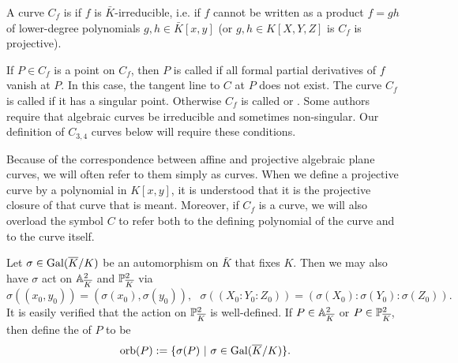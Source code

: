 A curve $C_f$ is  if $f$ is $\bar K$-irreducible,
i.e. if $f$ cannot be written as a product $f = gh$ of lower-degree polynomials $g, h \in \bar K[x,y]$
(or $g,h \in K[X,Y,Z]$ is $C_f$ is projective).

If $P \in C_f$ is a point on $C_f$,
then $P$ is called  if all formal partial derivatives of $f$ vanish at $P$.
In this case, the tangent line to $C$ at $P$ does not exist.
The curve $C_f$ is called  if it has a singular point.
Otherwise $C_f$ is called  or .
Some authors require that algebraic curves be irreducible and sometimes non-singular.
Our definition of $C_{3,4}$ curves below will require these conditions.

Because of the correspondence between affine and projective algebraic plane curves,
we will often refer to them simply as curves.
When we define a projective curve by a polynomial in $K[x,y]$,
it is understood that it is the projective closure of that curve that is meant.
Moreover, if $C_f$ is a curve,
we will also overload the symbol $C$ to refer both to the defining polynomial of the curve
and to the curve itself.

Let $\sigma \in \operatorname{Gal}(\overline K/K)$ be an automorphism on $\bar K$ that fixes $K$.
Then we may also have $\sigma$ act on $\mathbb{A}_{\overline K}^2$ and $\mathbb{P}_{\overline K}^2$ via
\[ \sigma((x_0, y_0)) = (\sigma(x_0), \sigma(y_0)), ~~~
   \sigma((X_0 : Y_0 : Z_0)) = (\sigma(X_0) : \sigma(Y_0) : \sigma(Z_0)). \]
It is easily verified that the action on $\mathbb{P}_{\overline K}^2$ is well-defined.
If $P \in \mathbb{A}_{\overline K}^2$ or $P \in \mathbb{P}_{\overline K}^2$,
then define the  of $P$ to be
\[ \operatorname{orb}(P) := \{ \sigma(P) ~|~ \sigma \in \operatorname{Gal}(\overline K/K) \}. \]

